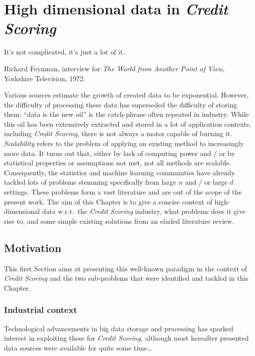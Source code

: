 \chapter{High dimensional data in \textit{Credit Scoring}} \label{chap7}


\epigraph{It's not complicated, it's just a lot of it.}{Richard Feynman, interview for \textit{The World from Another Point of View}, Yorkshire Television, 1972.}

\minitoc

Various sources estimate the growth of created data to be exponential. However, the difficulty of processing these data has superseded the difficulty of storing them: ``data is the new oil'' is the catch-phrase often repeated in industry. While this oil has been extensively extracted and stored in a lot of application contexts, including \textit{Credit Scoring}, there is not always a motor capable of burning it. \textit{Scalability} refers to the problem of applying an existing method to increasingly more data. It turns out that, either by lack of computing power and / or by statistical properties or assumptions not met, not all methods are scalable.
Consequently, the statistics and machine learning communities have already tackled lots of problems stemming specifically from large $n$ and / or large $d$ settings.
These problems form a vast literature and are out of the scope of the present work.
The aim of this Chapter is to give a concise context of high-dimensional data w.r.t.\ the \textit{Credit Scoring} industry, what problems does it give rise to, and some simple existing solutions from an eluded literature review.

\section{Motivation}

This first Section aims at presenting this well-known paradigm in the context of \textit{Credit Scoring} and the two sub-problems that were identified and tackled in this Chapter.

\subsection{Industrial context}

Technological advancements in big data storage and processing has sparked interest in exploiting these for \textit{Credit Scoring}, although most hereafter presented data sources were available for quite some time\dots

